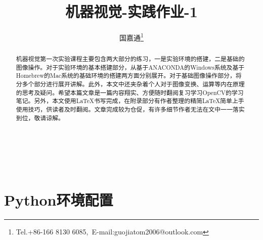 \documentclass[11pt]{article}
\title{机器视觉-实践作业-1}
\author{国嘉通\thanks{Tel.+86-166 8130 6085,\ E-mail:guojiatom2006@outlook.com}}
\let\Oldlatex\LaTeX
\renewcommand{\LaTeX}{\textrm{\Oldlatex}}
\begin{document}
    
    \maketitle
    
    \vspace*{4em}
    \begin{abstract}
    	机器视觉第一次实验课程主要包含两大部分的练习，一是实验环境的搭建，二是基础的图像操作。对于实验环境的基本搭建部分，从基于ANACONDA的Windows系统及基于Homebrew的Mac系统的基础环境的搭建两方面分别展开。对于基础图像操作部分，将分多个部分进行展开讲解。此外，本文中还夹杂着个人对于图像变换、运算等内在原理的思考及疑问。希望本篇文章是一篇内容翔实、方便随时翻阅复习学习OpenCV的学习笔记。另外，本文使用\LaTeX 书写完成，在附录部分有作者整理的精简\LaTeX 简单上手使用技巧，供读者及时翻阅。文章完成较为仓促，有许多细节作者无法在文中一一落实到位，敬请谅解。
    \end{abstract}
        
    \begin{center}
    	\\
    	\\
    \end{center}
    \newpage
    
    \tableofcontents
    
    \newpage
    
    \section{Python环境配置}
\end{document}
